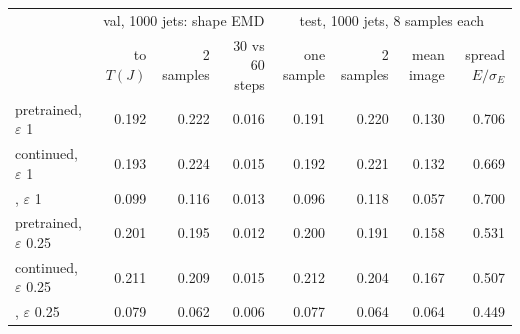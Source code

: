 \scriptsize
\setlength{\tabcolsep}{3pt}
\begin{tabular}{lrrrrrrr}
\toprule
 & \multicolumn{3}{c}{val, 1000 jets: shape EMD} & \multicolumn{4}{c}{test, 1000 jets, 8 samples each} \\
 & to $T(J)$ & 2 samples & 30 vs 60 steps & one sample & 2 samples & mean image & spread $E/\sigma_E$ \\
\midrule
\br{} pretrained, $\varepsilon$ 1 & 0.192 & 0.222 & 0.016 & 0.191 & 0.220 & 0.130 & 0.706 \\
\br{} continued, $\varepsilon$ 1 & 0.193 & 0.224 & 0.015 & 0.192 & 0.221 & 0.132 & 0.669 \\
\dsbm{}, $\varepsilon$ 1 & 0.099 & 0.116 & 0.013 & 0.096 & 0.118 & 0.057 & 0.700 \\
\br{} pretrained, $\varepsilon$ 0.25 & 0.201 & 0.195 & 0.012 & 0.200 & 0.191 & 0.158 & 0.531 \\
\br{} continued, $\varepsilon$ 0.25 & 0.211 & 0.209 & 0.015 & 0.212 & 0.204 & 0.167 & 0.507 \\
\dsbm{}, $\varepsilon$ 0.25 & 0.079 & 0.062 & 0.006 & 0.077 & 0.064 & 0.064 & 0.449 \\
\bottomrule
\end{tabular}
